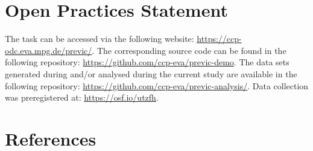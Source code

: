 \documentclass[
  man,floatsintext]{apa6}
\begin{document}
\hypertarget{open-practices-statement}{%
\section{Open Practices Statement}\label{open-practices-statement}}

The task can be accessed via the following website: \url{https://ccp-odc.eva.mpg.de/previc/}. The corresponding source code can be found in the following repository: \url{https://github.com/ccp-eva/previc-demo}. The data sets generated during and/or analysed during the current study are available in the following repository: \url{https://github.com/ccp-eva/previc-analysis/}. Data collection was preregistered at: \url{https://osf.io/utzfh}.

\newpage

\hypertarget{references}{%
\section{References}\label{references}}
\end{document}
